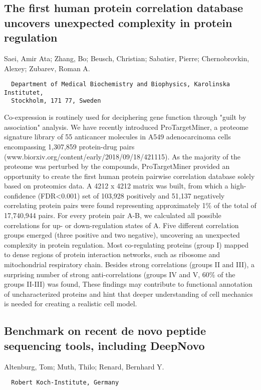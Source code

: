 {\subsection*{\color{eubicRed} The first human protein correlation database uncovers unexpected complexity in protein regulation}
{\color{eubicGray}Saei, Amir Ata;
Zhang, Bo;
Beusch, Christian;
Sabatier, Pierre;
Chernobrovkin, Alexey;
Zubarev, Roman A.}
{\color{eubicGray}\begin{verbatim}
  Department of Medical Biochemistry and Biophysics, Karolinska Institutet,
  Stockholm, 171 77, Sweden
\end{verbatim}}

Co-expression is routinely used for deciphering gene function through "guilt by association" analysis. We have recently introduced ProTargetMiner, a proteome signature library of 55 anticancer molecules in A549 adenocarcinoma cells encompassing 1,307,859 protein-drug pairs \newline (www.biorxiv.org/content/early/2018/09/18/421115). As the majority of the proteome was perturbed by the compounds, ProTargetMiner provided an opportunity to create the first human protein pairwise correlation database solely based on proteomics data. A 4212 x 4212 matrix was built, from which a high-confidence (FDR<0.001) set of 103,928 positively and 51,137 negatively correlating protein pairs were found representing approximately 1\% of the total of 17,740,944 pairs. For every protein pair A-B, we calculated all possible correlations for up- or down-regulation states of A. Five different correlation groups emerged (three positive and two negative), uncovering an unexpected complexity in protein regulation. Most co-regulating proteins (group I) mapped to dense regions of protein interaction networks, such as ribosome and mitochondrial respiratory chain. Besides strong correlations (groups II and III), a surprising number of strong anti-correlations (groups IV and V, 60\% of the groups II-III) was found, These findings may contribute to functional annotation of uncharacterized proteins and hint that deeper understanding of cell mechanics is needed for creating a realistic cell model.


\subsection*{\color{eubicRed} Benchmark on recent de novo peptide sequencing tools, including DeepNovo}
{\color{eubicGray}Altenburg, Tom;
Muth, Thilo;
Renard, Bernhard Y.}
{\color{eubicGray}\begin{verbatim}
  Robert Koch-Institute, Germany
\end{verbatim}}

}
